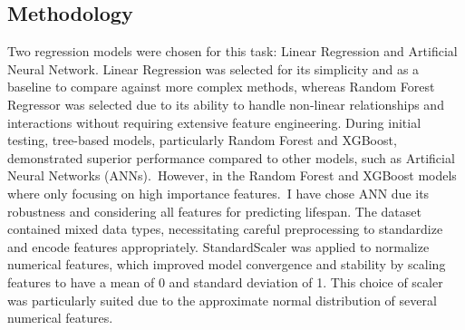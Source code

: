 \documentclass{article}
\begin{document}
\subsection{Methodology}




Two regression models were chosen for this task: Linear Regression and Artificial Neural Network. Linear Regression was selected for its simplicity and as a baseline to compare against more complex methods, whereas Random Forest Regressor was selected due to its ability to handle non-linear relationships and interactions without requiring extensive feature engineering. During initial testing, tree-based models, particularly Random Forest and XGBoost, demonstrated superior performance compared to other models, such as Artificial Neural Networks (ANNs). However, in the Random Forest and XGBoost models where only focusing on high importance features. I have chose ANN due its robustness and considering all features for predicting lifespan.
The dataset contained mixed data types, necessitating careful preprocessing to standardize and encode features appropriately. StandardScaler was applied to normalize numerical features, which improved model convergence and stability by scaling features to have a mean of 0 and standard deviation of 1. This choice of scaler was particularly suited due to the approximate normal distribution of several numerical features.
\end{document}
